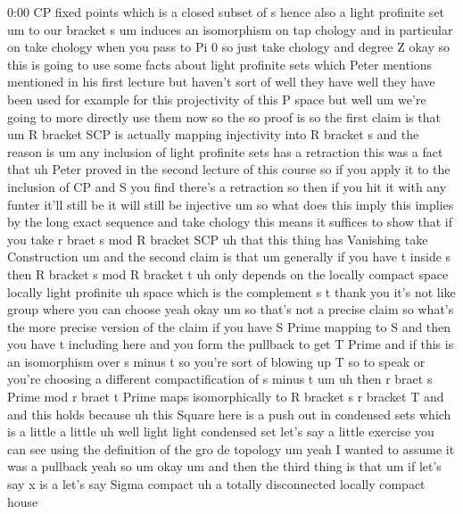 \begin{unfinished}{0:00}
CP  fixed  points  which  is  a  closed  subset
of  s  hence  also  a  light  profinite  set  um
to  our  bracket  s  um  induces  an
isomorphism  on  tap  chology
and  in  particular  on  take  chology  when
you  pass  to  Pi  0  so  just  take  chology
and  degree
Z
okay  so  this  is  going  to  use  some  facts
about  light  profinite  sets  which  Peter
mentions  mentioned  in  his  first  lecture
but  haven't  sort  of  well  they  have  well
they  have  been  used  for  example  for  this
projectivity  of  this  P  space  but
well  um  we're  going  to  more  directly  use
them  now  so  the  so  proof  is  so  the  first
claim  is  that
um  R  bracket
SCP  is  actually  mapping  injectivity  into
R  bracket
s  and  the  reason  is
um  any
inclusion  of  light  profinite
sets  has  a
retraction  this  was  a  fact  that  uh  Peter
proved  in  the  second  lecture  of  this
course  so  if  you  apply  it  to  the
inclusion  of  CP  and  S  you  find  there's  a
retraction  so  then  if  you  hit  it  with
any  funter  it'll  still  be  it  will  still
be
injective  um  so  what  does  this  imply
this  implies  by  the  long  exact  sequence
and  take  chology  this  means  it  suffices
to
show  that  if  you  take  r  braet  s  mod  R
bracket
SCP  uh  that  this  thing  has  Vanishing
take
Construction
um  and  the  second  claim  is  that  um
generally  if  you  have  t  inside  s  then  R
bracket  s  mod  R  bracket  t  uh  only
depends  on  the  locally  compact
space  locally  light
profinite  uh  space  which  is  the
complement  s  t  thank
you  it's  not  like  group  where  you  can
choose  yeah
okay  um  so  that's  not  a  precise  claim  so
what's  the  more  precise  version  of  the
claim  if  you  have  S  Prime  mapping  to  S
and  then  you  have  t  including  here  and
you  form  the  pullback  to  get  T  Prime  and
if  this  is  an  isomorphism  over  s  minus  t
so  you're  sort  of  blowing  up  T  so  to
speak  or  you're  choosing  a  different
compactification  of  s  minus  t
um  uh
then  r  braet  s  Prime  mod  r  braet  t  Prime
maps  isomorphically  to  R  bracket  s  r
bracket
T
and  and  this  holds
because  uh  this  Square
here  is  a  push
out  in  condensed
sets  which  is  a  little  a  little  uh  well
light  light  condensed  set  let's  say  a
little  exercise  you  can  see  using  the
definition  of  the  gro  de
topology
um  yeah  I  wanted  to  assume  it  was  a
pullback  yeah
so  um
okay  um  and  then  the  third  thing  is  that
um  if  let's  say  x  is  a  let's  say  Sigma
compact
uh  a  totally
disconnected  locally  compact  house

\end{unfinished}
